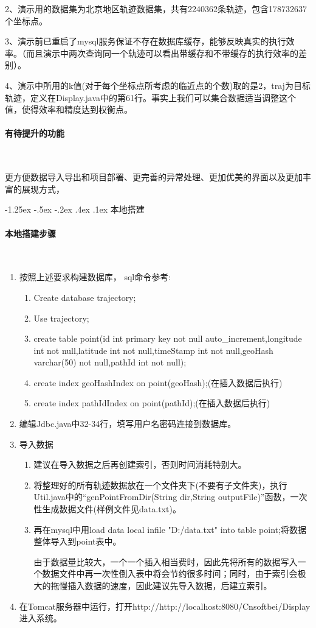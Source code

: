 \documentclass[a4paper, 11pt]{article}
\makeatletter
\newcommand{\xiaosihao}{\fontsize{12pt}{\baselineskip}\selectfont}
\renewcommand\subsection{\@startsection{subsection}{1}{\z@}%
{-1.25ex \@plus -.5ex \@minus -.2ex}%
{.4ex \@plus .1ex}%
{\normalfont\xiaosihao\CJKfamily{hei}}}
\makeatother
\begin{document}
\begin{CJK}{UTF8}{gbsn}
2、演示用的数据集为北京地区轨迹数据集，共有2240362条轨迹，包含178732637个坐标点。

3、演示前已重启了mysql服务保证不存在数据库缓存，能够反映真实的执行效率。（而且演示中两次查询同一个轨迹可以看出带缓存和不带缓存的执行效率的差别）。

4、演示中所用的k值(对于每个坐标点所考虑的临近点的个数)取的是2，traj为目标轨迹，定义在Display.java中的第61行。事实上我们可以集合数据适当调整这个值，使得效率和精度达到权衡点。

\paragraph{有待提升的功能}\ 

更方便数据导入导出和项目部署、更完善的异常处理、更加优美的界面以及更加丰富的展现方式，

\subsection{本地搭建}
\paragraph{本地搭建步骤}\ 
\begin{enumerate}
\item  按照上述要求构建数据库， sql命令参考:
 \begin{enumerate}
\item Create database trajectory;
\item Use trajectory;
\item create table point(id int primary key not null auto\_increment,longitude int not null,latitude int not null,timeStamp int not null,geoHash varchar(50) not null,pathId int not null);
\item create index geoHashIndex on point(geoHash);(在插入数据后执行)
\item create index pathIdIndex on point(pathId);(在插入数据后执行)
\end{enumerate}
\item  编辑Jdbc.java中32-34行，填写用户名密码连接到数据库。
\item  导入数据
\begin{enumerate}
\item 建议在导入数据之后再创建索引，否则时间消耗特别大。
\item 将整理好的所有轨迹数据放在一个文件夹下(不要有子文件夹)，执行Util.java中的“genPointFromDir(String dir,String outputFile)”函数，一次性生成数据文件(样例文件见data.txt)。
\item 再在mysql中用load data local infile "D:/data.txt" into table point;将数据整体导入到point表中。

由于数据量比较大，一个一个插入相当费时，因此先将所有的数据写入一个数据文件中再一次性倒入表中将会节约很多时间；同时，由于索引会极大的拖慢插入数据的速度，因此建议先导入数据，后建立索引。
\end{enumerate}
\item  在Tomcat服务器中运行，打开http://http://localhost:8080/Cnsoftbei/Display进入系统。
\end{enumerate}
\newpage
\end{CJK}
\end{document}
